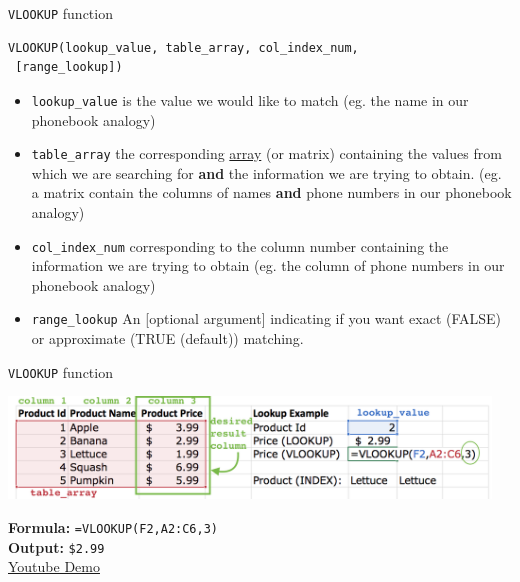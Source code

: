 \documentclass[xcolor=svgnames]{beamer}
\begin{document}
\begin{frame}[fragile]{\texttt{VLOOKUP} function}
\begin{verbatim}
VLOOKUP(lookup_value, table_array, col_index_num,
 [range_lookup])
\end{verbatim}
\begin{itemize}
\item {\tt lookup\_value} is the value we would like to match (eg. the name in our phonebook analogy)
\item {\tt table\_array} the corresponding \underline{array} (or matrix) containing the values from which we are searching for {\bf and} the information we are trying to obtain. (eg. a matrix contain the columns of names {\bf and} phone numbers in our phonebook analogy)
\item {\tt col\_index\_num} corresponding to the column number containing the information we are trying to obtain (eg. the column of phone numbers in our phonebook analogy)
\item {\tt range\_lookup} An [optional argument] indicating if you want exact (FALSE) or approximate (TRUE (default)) matching.
\end{itemize}
\end{frame}



\begin{frame}[fragile]{\texttt{VLOOKUP} function}
\begin{center}
 \includegraphics[width=0.96\textwidth]{img/vlookupZoom.png}
\end{center}
{\bf Formula:} {\tt =VLOOKUP(F2,A2:C6,3)}\\
{\bf Output:} {\tt \$2.99}\\
\href{https://youtu.be/q575W8vM7FY}{Youtube Demo}
\end{frame}
\end{document}
